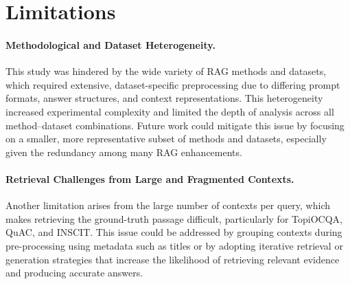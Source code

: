 \documentclass[11pt]{article}
\begin{document}
\section*{Limitations}

\paragraph{Methodological and Dataset Heterogeneity.}
This study was hindered by the wide variety of RAG methods and datasets, which required extensive, dataset-specific preprocessing due to differing prompt formats, answer structures, and context representations. This heterogeneity increased experimental complexity and limited the depth of analysis across all method–dataset combinations. Future work could mitigate this issue by focusing on a smaller, more representative subset of methods and datasets, especially given the redundancy among many RAG enhancements.

\paragraph{Retrieval Challenges from Large and Fragmented Contexts.}
Another limitation arises from the large number of contexts per query, which makes retrieving the ground-truth passage difficult, particularly for TopiOCQA, QuAC, and INSCIT. This issue could be addressed by grouping contexts during pre-processing using metadata such as titles or by adopting iterative retrieval or generation strategies that increase the likelihood of retrieving relevant evidence and producing accurate answers.


\end{document}
